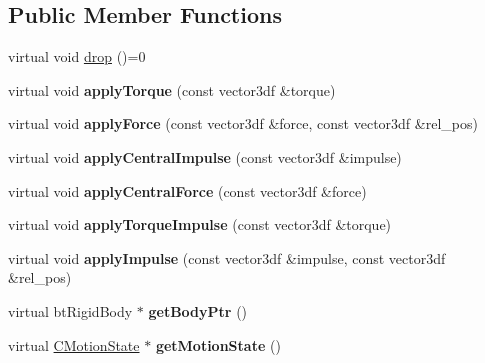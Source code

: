 \subsection*{Public Member Functions}
\begin{DoxyCompactItemize}
\item 
virtual void \hyperlink{class_c_irr_b_p_rigid_body_a961d442e36e78260e7a6f203fd0c11e9}{drop} ()=0
\item 
\hypertarget{class_c_irr_b_p_rigid_body_a93948bb4c79cea0b3172c5fe1146007c}{
virtual void {\bfseries applyTorque} (const vector3df \&torque)}
\label{class_c_irr_b_p_rigid_body_a93948bb4c79cea0b3172c5fe1146007c}

\item 
\hypertarget{class_c_irr_b_p_rigid_body_aa3fbb7492486b64b0f53e3243f20d3db}{
virtual void {\bfseries applyForce} (const vector3df \&force, const vector3df \&rel\_\-pos)}
\label{class_c_irr_b_p_rigid_body_aa3fbb7492486b64b0f53e3243f20d3db}

\item 
\hypertarget{class_c_irr_b_p_rigid_body_a4697f05241c551fbd80d2786507ceed4}{
virtual void {\bfseries applyCentralImpulse} (const vector3df \&impulse)}
\label{class_c_irr_b_p_rigid_body_a4697f05241c551fbd80d2786507ceed4}

\item 
\hypertarget{class_c_irr_b_p_rigid_body_aea6add503a694f1b54f9b406217416d1}{
virtual void {\bfseries applyCentralForce} (const vector3df \&force)}
\label{class_c_irr_b_p_rigid_body_aea6add503a694f1b54f9b406217416d1}

\item 
\hypertarget{class_c_irr_b_p_rigid_body_a633f6f306f2b061870c78ae5137fe238}{
virtual void {\bfseries applyTorqueImpulse} (const vector3df \&torque)}
\label{class_c_irr_b_p_rigid_body_a633f6f306f2b061870c78ae5137fe238}

\item 
\hypertarget{class_c_irr_b_p_rigid_body_a7cda3cfa35a7b6325b67bc48cc1adcdb}{
virtual void {\bfseries applyImpulse} (const vector3df \&impulse, const vector3df \&rel\_\-pos)}
\label{class_c_irr_b_p_rigid_body_a7cda3cfa35a7b6325b67bc48cc1adcdb}

\item 
\hypertarget{class_c_irr_b_p_rigid_body_a3e4f7b3000b5955bd8731be4104d963a}{
virtual btRigidBody $\ast$ {\bfseries getBodyPtr} ()}
\label{class_c_irr_b_p_rigid_body_a3e4f7b3000b5955bd8731be4104d963a}

\item 
\hypertarget{class_c_irr_b_p_rigid_body_a1242a37feff707d535c66508afc4bc7f}{
virtual \hyperlink{class_c_motion_state}{CMotionState} $\ast$ {\bfseries getMotionState} ()}
\label{class_c_irr_b_p_rigid_body_a1242a37feff707d535c66508afc4bc7f}


\end{DoxyCompactItemize}
